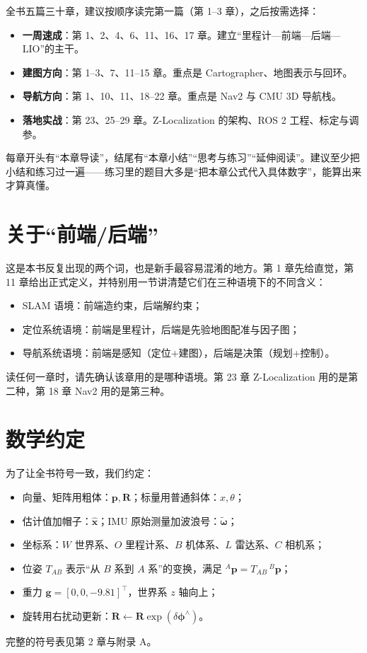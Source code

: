 全书五篇三十章，建议按顺序读完第一篇（第 1--3 章），之后按需选择：

\begin{itemize}
  \item \textbf{一周速成}：第 1、2、4、6、11、16、17 章。建立“里程计—前端—后端—LIO”的主干。
  \item \textbf{建图方向}：第 1--3、7、11--15 章。重点是 Cartographer、地图表示与回环。
  \item \textbf{导航方向}：第 1、10、11、18--22 章。重点是 Nav2 与 CMU 3D 导航栈。
  \item \textbf{落地实战}：第 23、25--29 章。Z-Localization 的架构、ROS 2 工程、标定与调参。
\end{itemize}

每章开头有“本章导读”，结尾有“本章小结”“思考与练习”“延伸阅读”。建议至少把小结和练习过一遍——练习里的题目大多是“把本章公式代入具体数字”，能算出来才算真懂。

\section*{关于“前端/后端”}

这是本书反复出现的两个词，也是新手最容易混淆的地方。第 1 章先给直觉，第 11 章给出正式定义，并特别用一节讲清楚它们在三种语境下的不同含义：
\begin{itemize}
  \item SLAM 语境：前端造约束，后端解约束；
  \item 定位系统语境：前端是里程计，后端是先验地图配准与因子图；
  \item 导航系统语境：前端是感知（定位+建图），后端是决策（规划+控制）。
\end{itemize}
读任何一章时，请先确认该章用的是哪种语境。第 23 章 Z-Localization 用的是第二种，第 18 章 Nav2 用的是第三种。

\section*{数学约定}

为了让全书符号一致，我们约定：
\begin{itemize}
  \item 向量、矩阵用粗体：$\bm{p},\bm{R}$；标量用普通斜体：$x,\theta$；
  \item 估计值加帽子：$\hat{\bm{x}}$；IMU 原始测量加波浪号：$\tilde{\bm{\omega}}$；
  \item 坐标系：$W$ 世界系、$O$ 里程计系、$B$ 机体系、$L$ 雷达系、$C$ 相机系；
  \item 位姿 $T_{AB}$ 表示“从 $B$ 系到 $A$ 系”的变换，满足 ${}^{A}\bm{p}=T_{AB}\,{}^{B}\bm{p}$；
  \item 重力 $\bm{g}=[0,0,-9.81]^{\top}$，世界系 $z$ 轴向上；
  \item 旋转用右扰动更新：$\bm{R}\leftarrow\bm{R}\exp(\delta\bm{\phi}^{\wedge})$。
\end{itemize}
完整的符号表见第 2 章与附录 A。

